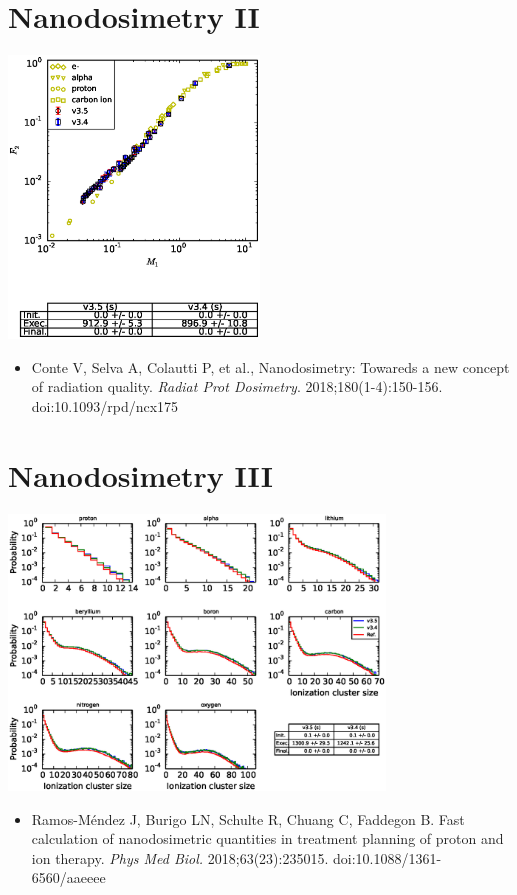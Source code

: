 \documentclass[aspectratio=1610]{beamer}
\begin{document}
\section{Nanodosimetry II}

\begin{frame}{\secname}
 \centering
   \includegraphics[width=0.5\textwidth]{NanodosimetryII}
\begin{itemize}
 \item \tiny{Conte V, Selva A, Colautti P, et al., Nanodosimetry: Towareds a new concept of radiation quality. \textit{Radiat Prot Dosimetry}. 2018;180(1-4):150-156. doi:10.1093/rpd/ncx175}
\end{itemize}
\end{frame}


\section{Nanodosimetry III}

\begin{frame}{\secname}
 \centering
   \includegraphics[width=0.75\textwidth]{NanodosimetryIII}
\begin{itemize}
 \item \tiny{Ramos-M\'endez J, Burigo LN, Schulte R, Chuang C, Faddegon B. Fast calculation of nanodosimetric quantities in treatment planning of proton and ion therapy. \textit{Phys Med Biol.} 2018;63(23):235015. doi:10.1088/1361-6560/aaeeee}
\end{itemize}
\end{frame}
\end{document}
